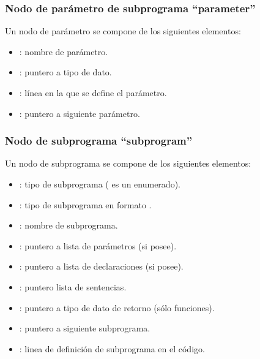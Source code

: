 \subsubsection{Nodo de parámetro de subprograma ``parameter''}
\noindent
Un nodo de parámetro se compone de los siguientes elementos:
\begin{itemize}
    \item {} : nombre de parámetro.
    \item {} : puntero a tipo de dato.
    \item {} : línea en la que se define el parámetro.
    \item {} : puntero a siguiente parámetro.
\end{itemize}

\subsubsection{Nodo de subprograma ``subprogram''}
\noindent
Un nodo de subprograma se compone de los siguientes elementos:
\begin{itemize}
    \item {}: tipo de subprograma ( es un enumerado).
    \item {}: tipo de subprograma en formato .
    \item {}: nombre de subprograma.
    \item {}: puntero a lista de parámetros (si posee).
    \item {}: puntero a lista de declaraciones (si posee).
    \item {}: puntero  lista de sentencias.
    \item {}: puntero a tipo de dato de retorno (sólo funciones).
    \item {}: puntero a siguiente subprograma.
    \item {}: linea de definición de subprograma en el código.
\end{itemize}

